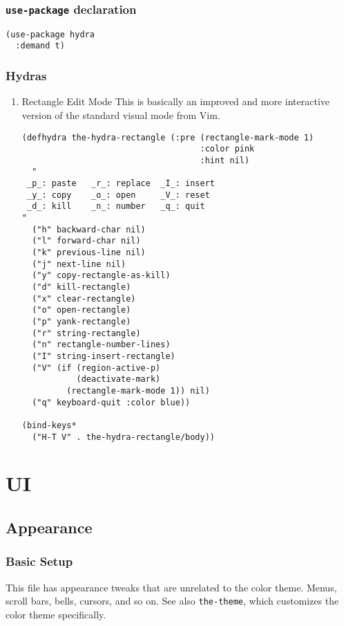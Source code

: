 \documentclass[11pt]{article}
\begin{document}
\subsubsection{\texttt{use-package} declaration}
\label{sec:orgd7b797b}
\begin{verbatim}
(use-package hydra
  :demand t)
\end{verbatim}

\subsubsection{Hydras}
\label{sec:org0ad3cb0}

\begin{enumerate}
\item Rectangle Edit Mode
\label{sec:orgc78cd23}
This is basically an improved and more interactive version of the
standard visual mode from Vim.

\begin{verbatim}
(defhydra the-hydra-rectangle (:pre (rectangle-mark-mode 1)
                                    :color pink
                                    :hint nil)
  "
 _p_: paste   _r_: replace  _I_: insert
 _y_: copy    _o_: open     _V_: reset
 _d_: kill    _n_: number   _q_: quit
"
  ("h" backward-char nil)
  ("l" forward-char nil)
  ("k" previous-line nil)
  ("j" next-line nil)
  ("y" copy-rectangle-as-kill)
  ("d" kill-rectangle)
  ("x" clear-rectangle)
  ("o" open-rectangle)
  ("p" yank-rectangle)
  ("r" string-rectangle)
  ("n" rectangle-number-lines)
  ("I" string-insert-rectangle)
  ("V" (if (region-active-p)
           (deactivate-mark)
         (rectangle-mark-mode 1)) nil)
  ("q" keyboard-quit :color blue))

(bind-keys*
  ("H-T V" . the-hydra-rectangle/body))
\end{verbatim}
\end{enumerate}
\section{UI}
\label{sec:org09cff2c}
\subsection{Appearance}
\label{sec:org67c21ef}
\subsubsection{Basic Setup}
\label{sec:org2af6f92}
This file has appearance tweaks that are unrelated to the color
theme. Menus, scroll bars, bells, cursors, and so on. See also
\texttt{the-theme}, which customizes the color theme specifically.
\end{document}
